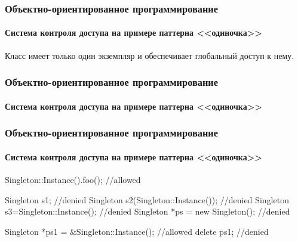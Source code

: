 \begin{frame}
    \frametitle{Объектно-ориентированное программирование}
    \framesubtitle{Система контроля доступа на примере паттерна <<одиночка>>}
    \begin{example}[Singleton]
        Класс имеет только один экземпляр и обеспечивает глобальный доступ к нему.
    \end{example}
\end{frame}


\begin{frame}[fragile]
    \frametitle{Объектно-ориентированное программирование}
    \framesubtitle{Система контроля доступа на примере паттерна <<одиночка>>}
\begin{semiverbatim}
\end{semiverbatim}
\end{frame}


\begin{frame}[fragile]
    \frametitle{Объектно-ориентированное программирование}
    \framesubtitle{Система контроля доступа на примере паттерна <<одиночка>>}
\begin{semiverbatim}
    Singleton::Instance().foo();             //allowed
    
    Singleton s1;                            //\alert{denied}
    Singleton s2(Singleton::Instance());     //\alert{denied}
    Singleton s3=Singleton::Instance();      //\alert{denied}
    Singleton *ps = new Singleton();         //\alert{denied}
    
    Singleton *ps1 = &Singleton::Instance(); //allowed
    delete ps1;                              //\alert{denied}
\end{semiverbatim}
\end{frame}

